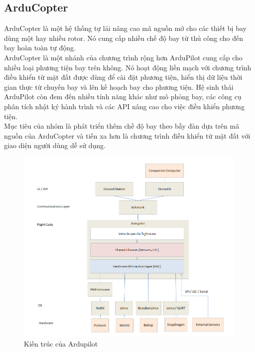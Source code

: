             \subsection{ArduCopter}
            ArduCopter là một hệ thống tự lái nâng cao mã nguồn mở cho các thiết bị bay dùng một hay nhiều rotor. Nó cung cấp nhiều chế độ bay từ thủ công cho đến bay hoàn toàn tự động.\\
            ArduCopter là một nhánh của chương trình rộng hơn ArduPilot cung cấp cho nhiều loại phương tiện bay trên không. Nó hoạt động liền mạch với chương trình điều khiển từ mặt đất được dùng để cài đặt phương tiện, hiển thị dữ liệu thời gian thực từ chuyến bay và lên kế hoạch bay cho phương tiện. Hệ sinh thái ArduPilot còn đem đến nhiều tính năng khác như mô phỏng bay, các công cụ phân tích nhật ký hành trình và các API nâng cao cho việc điều khiển phương tiện.\\
            Mục tiêu của nhóm là phát triển thêm chế độ bay theo bầy đàn dựa trên mã nguồn của ArduCopter và tiến xa hơn là chương trình điều khiển từ mặt đất với giao diện người dùng dễ sử dụng.
    
    \begin{figure}[h!]
    	\begin{center}
    		\includegraphics[scale=0.5]{images/ArduPilot_HighLevelArchecture.png}
    		\caption{Kiến trúc của Ardupilot}
    	\end{center}
    \end{figure}

